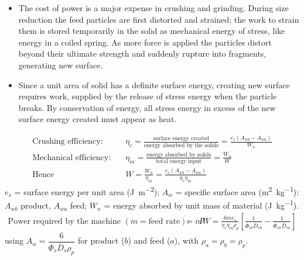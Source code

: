 \documentclass[10pt,a4paper]{article}
\newcommand{\spsub}[1]{\par\addvspace{7pt}\noindent{\color{accent}\bfseries #1}\par\addvspace{3pt}\nopagebreak}
\begin{document}
\spsub{Energy and power requirement}
\begin{itemize}
  \item The cost of power is a major expense in crushing and grinding. During size reduction the feed particles are first distorted and strained; the work to strain them is stored temporarily in the solid as mechanical energy of stress, like energy in a coiled spring. As more force is applied the particles distort beyond their ultimate strength and suddenly rupture into fragments, generating new surface.
  \item Since a unit area of solid has a definite surface energy, creating new surface requires work, supplied by the release of stress energy when the particle breaks. By conservation of energy, all stress energy in excess of the new surface energy created must appear as heat.
\end{itemize}
\begin{formulabox}
\begin{align*}
\text{Crushing efficiency:}\quad & \eta_c=\frac{\text{surface energy created}}{\text{energy absorbed by the solids}}
  =\frac{e_s(A_{wb}-A_{wa})}{W_n}\\[3pt]
\text{Mechanical efficiency:}\quad & \eta_m=\frac{\text{energy absorbed by solids}}{\text{total energy input}}=\frac{W_n}{W}\\[3pt]
\text{Hence}\quad & W=\frac{W_n}{\eta_m}=\frac{e_s(A_{wb}-A_{wa})}{\eta_c\eta_m}
\end{align*}
\vspace{2pt}
{\small
$e_s$ = surface energy per unit area (\si{\joule\per\square\meter}); \quad
$A_w$ = specific surface area (\si{\square\meter\per\kilogram}): $A_{wb}$ product, $A_{wa}$ feed; \quad
$W_n$ = energy absorbed by unit mass of material (\si{\joule\per\kilogram}).}
\vspace{3pt}
\begin{align*}
\text{Power required by the machine }(\dot m = \text{feed rate}):\quad
P &= \dot m W
   = \frac{6\dot m e_s}{\eta_c\eta_m\rho_p}
     \left[\frac{1}{\Phi_{sb}\overline{D}_{sb}}-\frac{1}{\Phi_{sa}\overline{D}_{sa}}\right]
\end{align*}
{\small using $A_w=\dfrac{6}{\Phi_s\overline{D}_s\rho_p}$ for product ($b$) and feed ($a$), with $\rho_a=\rho_b=\rho_p$.}
\end{formulabox}
\end{document}
